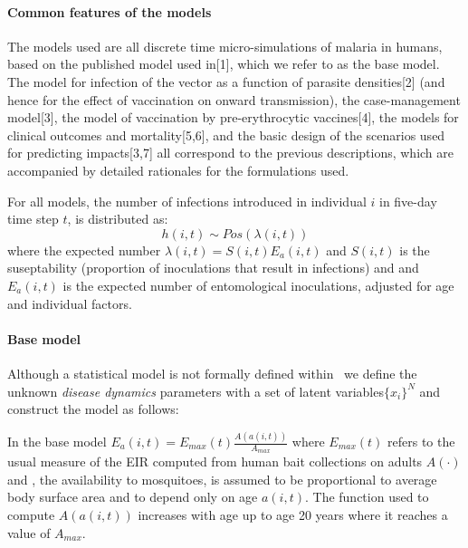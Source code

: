 \documentclass{article}
\begin{document}
\paragraph{Common features of the models}
The models used are all discrete time micro-simulations of malaria in humans, 
based on the published model used in[1], which we refer to as the base model.
The model for infection of the vector as a function of parasite densities[2] 
(and hence for the effect of vaccination on onward transmission), the case-management model[3], 
the model of vaccination by pre-erythrocytic vaccines[4], the models for clinical outcomes and mortality[5,6], 
and the basic design of the scenarios used for predicting impacts[3,7] all correspond to the previous descriptions,
 which are accompanied by detailed rationales for the formulations used.  

For all models, the number of infections  introduced in individual $i$ in five-day time step $t$, is distributed as:
\begin{equation}
  h(i,t) \sim \textit{Pos}(\lambda(i,t))
\end{equation}
where the expected number $\lambda(i,t) = S(i,t)E_a(i,t)$ and $S(i,t)$ is the suseptability
(proportion of inoculations that result in infections) and and $E_{a}(i,t)$ is the expected number of entomological inoculations, adjusted for age and individual factors.


\paragraph{Base model}
Although a statistical model is not formally defined within~\cite{smith2006relationship}
we define the unknown \emph{disease dynamics} parameters with a set of latent variables$\{x_{i}\}^{N}$
and construct the model as follows: 

In the base model $E_{a}(i,t) = E_{max}(t) \frac{A(a(i,t))}{A_{max}}$ where $E_{max}(t)$ refers to the usual measure of the EIR computed from human bait collections on adults $A(\cdot)$ and , the availability to mosquitoes,
 is assumed to be proportional to average body surface area and to depend only on age $a(i,t)$.
The function used to compute $A(a(i,t))$ increases with age up to age 20 years where it reaches a value of $A_{max}$.
\end{document}
